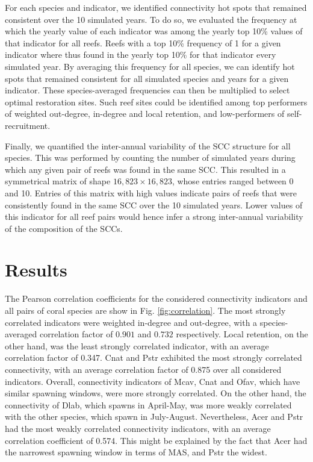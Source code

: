 \documentclass[fleqn,10pt]{wlscirep}
\begin{document}
For each species and indicator, we identified connectivity hot spots that remained consistent over the 10 simulated years. To do so, we evaluated the frequency at which the yearly value of each indicator was among the yearly top 10\% values of that indicator for all reefs. Reefs with a top 10\% frequency of 1 for a given indicator where thus found in the yearly top 10\% for that indicator every simulated year. By averaging this frequency for all species, we can identify hot spots that remained consistent for all simulated species and years for a given indicator. These species-averaged frequencies can then be multiplied to select optimal restoration sites. Such reef sites could be identified among top performers of weighted out-degree, in-degree and local retention, and low-performers of self-recruitment.

Finally, we quantified the inter-annual variability of the SCC structure for all species. This was performed by counting the number of simulated years during which any given pair of reefs was found in the same SCC. This resulted in a symmetrical matrix of shape $16,823 \times 16,823$, whose entries ranged between 0 and 10. Entries of this matrix with high values indicate pairs of reefs that were consistently found in the same SCC over the 10 simulated years. Lower values of this indicator for all reef pairs would hence infer a strong inter-annual variability of the composition of the SCCs.

\section*{Results}

% 

The Pearson correlation coefficients for the considered connectivity indicators and all pairs of coral species are show  in Fig. \ref{fig:correlation}. The most strongly correlated indicators were weighted in-degree and out-degree, with a species-averaged correlation factor of $0.901$ and $0.732$ respectively. Local retention, on the other hand, was the least strongly correlated indicator, with an average correlation factor of 0.347. Cnat and Pstr exhibited the most strongly correlated connectivity, with an average correlation factor of 0.875 over all considered indicators. Overall, connectivity indicators of Mcav, Cnat and Ofav, which have similar spawning windows, were more strongly correlated. On the other hand, the connectivity of Dlab, which spawns in April-May, was more weakly correlated with the other species, which spawn in July-August. Nevertheless, Acer and Pstr had the most weakly correlated connectivity indicators, with an average correlation coefficient of 0.574. This might be explained by the fact that Acer had the narrowest spawning window in terms of MAS, and Pstr the widest.
\end{document}
